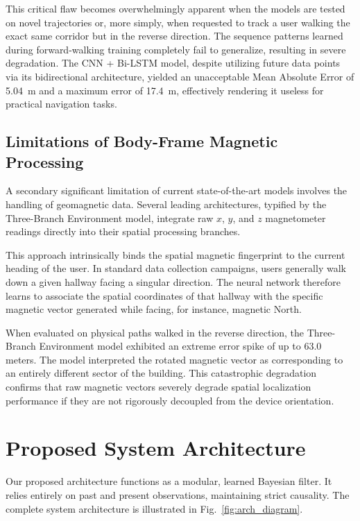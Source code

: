 \documentclass[conference]{IEEEtran}
\begin{document}
This critical flaw becomes overwhelmingly apparent when the models are tested on novel trajectories or, more simply, when requested to track a user walking the exact same corridor but in the reverse direction. The sequence patterns learned during forward-walking training completely fail to generalize, resulting in severe degradation. The CNN + Bi-LSTM model, despite utilizing future data points via its bidirectional architecture, yielded an unacceptable Mean Absolute Error of 5.04~m and a maximum error of 17.4~m, effectively rendering it useless for practical navigation tasks.

\subsection{Limitations of Body-Frame Magnetic Processing}

A secondary significant limitation of current state-of-the-art models involves the handling of geomagnetic data. Several leading architectures, typified by the Three-Branch Environment model, integrate raw $x$, $y$, and $z$ magnetometer readings directly into their spatial processing branches. 

This approach intrinsically binds the spatial magnetic fingerprint to the current heading of the user. In standard data collection campaigns, users generally walk down a given hallway facing a singular direction. The neural network therefore learns to associate the spatial coordinates of that hallway with the specific magnetic vector generated while facing, for instance, magnetic North. 

When evaluated on physical paths walked in the reverse direction, the Three-Branch Environment model exhibited an extreme error spike of up to 63.0 meters. The model interpreted the rotated magnetic vector as corresponding to an entirely different sector of the building. This catastrophic degradation confirms that raw magnetic vectors severely degrade spatial localization performance if they are not rigorously decoupled from the device orientation.

\section{Proposed System Architecture}\label{sec:architecture}

Our proposed architecture functions as a modular, learned Bayesian filter. It relies entirely on past and present observations, maintaining strict causality. The complete system architecture is illustrated in Fig.~\ref{fig:arch_diagram}.
\end{document}

